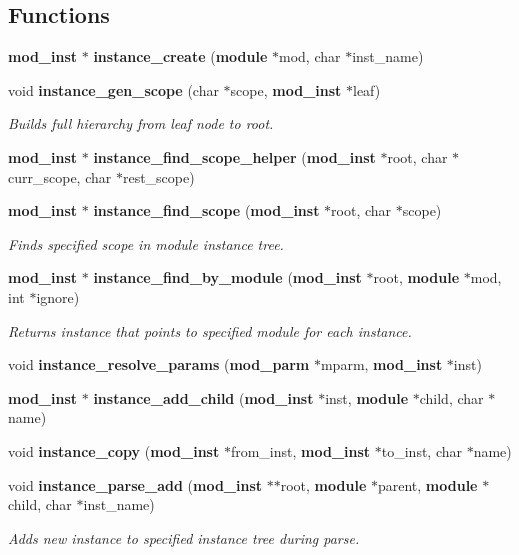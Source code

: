 \subsection*{Functions}
\begin{CompactItemize}
\item 
{\bf mod\_\-inst} $\ast$ {\bf instance\_\-create} ({\bf module} $\ast$mod, char $\ast$inst\_\-name)
\item 
void {\bf instance\_\-gen\_\-scope} (char $\ast$scope, {\bf mod\_\-inst} $\ast$leaf)
\begin{CompactList}\small\item\em Builds full hierarchy from leaf node to root.\item\end{CompactList}\item 
{\bf mod\_\-inst} $\ast$ {\bf instance\_\-find\_\-scope\_\-helper} ({\bf mod\_\-inst} $\ast$root, char $\ast$curr\_\-scope, char $\ast$rest\_\-scope)
\item 
{\bf mod\_\-inst} $\ast$ {\bf instance\_\-find\_\-scope} ({\bf mod\_\-inst} $\ast$root, char $\ast$scope)
\begin{CompactList}\small\item\em Finds specified scope in module instance tree.\item\end{CompactList}\item 
{\bf mod\_\-inst} $\ast$ {\bf instance\_\-find\_\-by\_\-module} ({\bf mod\_\-inst} $\ast$root, {\bf module} $\ast$mod, int $\ast$ignore)
\begin{CompactList}\small\item\em Returns instance that points to specified module for each instance.\item\end{CompactList}\item 
void {\bf instance\_\-resolve\_\-params} ({\bf mod\_\-parm} $\ast$mparm, {\bf mod\_\-inst} $\ast$inst)
\item 
{\bf mod\_\-inst} $\ast$ {\bf instance\_\-add\_\-child} ({\bf mod\_\-inst} $\ast$inst, {\bf module} $\ast$child, char $\ast$name)
\item 
void {\bf instance\_\-copy} ({\bf mod\_\-inst} $\ast$from\_\-inst, {\bf mod\_\-inst} $\ast$to\_\-inst, char $\ast$name)
\item 
void {\bf instance\_\-parse\_\-add} ({\bf mod\_\-inst} $\ast$$\ast$root, {\bf module} $\ast$parent, {\bf module} $\ast$child, char $\ast$inst\_\-name)
\begin{CompactList}\small\item\em Adds new instance to specified instance tree during parse.\item\end{CompactList}\item 
$$
\end{CompactItemize}
